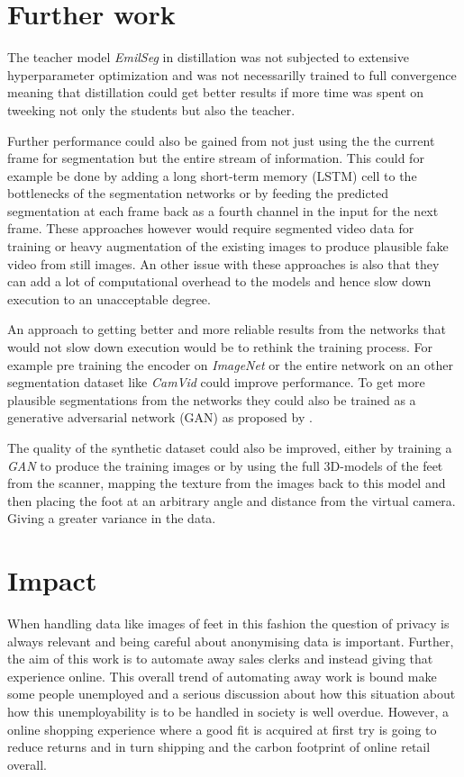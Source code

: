 \documentclass{kththesis}
\begin{document}
\section{Further work}
The teacher model \textit{EmilSeg} in distillation
was not subjected to extensive hyperparameter optimization and was not
necessarilly trained to full convergence meaning that distillation could get
better results if more time was spent on tweeking not only the students but
also the teacher.

Further performance could also be gained from not just using the the current
frame for segmentation but the entire stream of information. This could for
example be done by adding a long short-term memory (LSTM) cell to the
bottlenecks of the segmentation networks or by feeding the predicted
segmentation at each frame back as a fourth channel in the input for the next
frame. These approaches however would require segmented video data for training
or heavy augmentation of the existing images to produce plausible fake video
from still images. An other issue with these approaches is also that they can
add a lot of computational overhead to the models and hence slow down execution to an
unacceptable degree.

An approach to getting better and more reliable results from the networks that
would not slow down execution would be to rethink the training process. For
example pre training the encoder on \textit{ImageNet} or the entire network on
an other segmentation dataset like \textit{CamVid} could improve performance. To
get more plausible segmentations from the networks they could also be trained as
a generative adversarial network
(GAN) as proposed by \textcite{AdverserialSegmentation}.

The quality of the synthetic dataset could also be improved, either by training a
\textit{GAN} to produce the training images or by using the full 3D-models of
the feet from the scanner, mapping the texture from the images back to this model
and then placing the foot at an arbitrary angle and distance from the virtual
camera. Giving a greater variance in the data.

\section{Impact}
When handling data like images of feet in this fashion the question of privacy
is always relevant and being careful about anonymising data is important.
Further, the aim of this work is to automate away sales clerks and instead
giving that experience online. This overall trend of automating away work is
bound make some people unemployed and a serious discussion about how this
situation about how this unemployability is to be handled in society is well
overdue. However, a online shopping experience where a good fit is acquired at
first try is going to reduce returns and in turn shipping and the carbon
footprint of online retail overall. 
\end{document}
